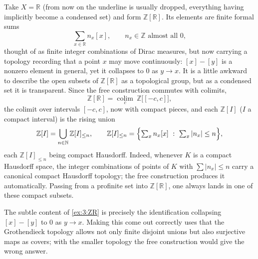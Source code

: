 \begin{example}
\label{ex:3:ZR}
Take $X=\mathbb{R}$ (from now on the underline is usually dropped, everything
having implicitly become a condensed set) and form $\mathbb{Z}[\mathbb{R}]$. Its
elements are finite formal sums
\begin{equation*}
\sum_{x\in\mathbb{R}} n_x[x],\qquad n_x\in\mathbb{Z}\text{ almost all }0,
\end{equation*}
thought of as finite integer combinations of Dirac measures, but now carrying a
topology recording that a point $x$ may move continuously: $[x]-[y]$ is a nonzero
element in general, yet it collapses to $0$ as $y\to x$. It is a little awkward
to describe the open subsets of $\mathbb{Z}[\mathbb{R}]$ as a topological group,
but as a condensed set it is transparent. Since the free construction commutes
with colimits,
\begin{equation*}
\mathbb{Z}[\mathbb{R}]
=\operatorname*{colim}_{c}\ \mathbb{Z}\bigl[[-c,c]\bigr],
\end{equation*}
the colimit over intervals $[-c,c]$, now with compact pieces, and each
$\mathbb{Z}[I]$ ($I$ a compact interval) is the rising union
\begin{equation*}
\mathbb{Z}[I]=\bigcup_{n\in\mathbb{N}}\mathbb{Z}[I]_{\leq n},
\qquad
\mathbb{Z}[I]_{\leq n}=\Bigl\{\textstyle\sum_x n_x[x]\ :\ \sum_x|n_x|\leq n\Bigr\},
\end{equation*}
each $\mathbb{Z}[I]_{\leq n}$ being compact Hausdorff. Indeed, whenever $K$ is a
compact Hausdorff space, the integer combinations of points of $K$ with
$\sum|n_x|\leq n$ carry a canonical compact Hausdorff topology; the free
construction produces it automatically. Passing from a profinite set into
$\mathbb{Z}[\mathbb{R}]$, one always lands in one of these compact subsets.
\end{example}

\begin{remark}
\label{rmk:3:collapse-needs-surjections}
The subtle content of \cref{ex:3:ZR} is precisely the identification collapsing
$[x]-[y]$ to $0$ as $y\to x$. Making this come out correctly uses that the
Grothendieck topology allows not only finite disjoint unions but also surjective
maps as covers; with the smaller topology the free construction would give the
wrong answer.
\end{remark}

